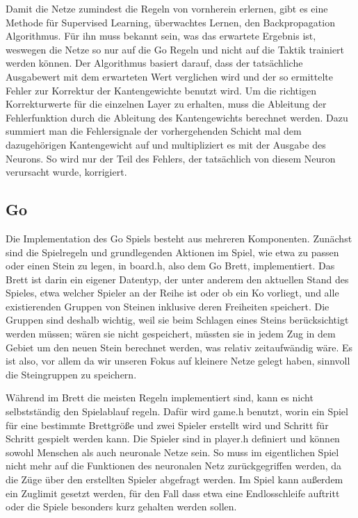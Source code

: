 Damit die Netze zumindest die Regeln von vornherein erlernen, gibt es eine
Methode für Supervised Learning, überwachtes Lernen, den Backpropagation
Algorithmus. Für ihn muss bekannt sein, was das erwartete Ergebnis ist, weswegen
die Netze so nur auf die Go Regeln und nicht auf die Taktik trainiert werden
können. Der Algorithmus basiert darauf, dass der tatsächliche Ausgabewert mit
dem erwarteten Wert verglichen wird und der so ermittelte Fehler zur Korrektur
der Kantengewichte benutzt wird. Um die richtigen Korrekturwerte für die
einzelnen Layer zu erhalten, muss die Ableitung der Fehlerfunktion durch die
Ableitung des Kantengewichts berechnet werden. Dazu summiert man die
Fehlersignale der vorhergehenden Schicht mal dem dazugehörigen Kantengewicht auf
und multipliziert es mit der Ausgabe des Neurons. So wird nur der Teil des
Fehlers, der tatsächlich von diesem Neuron verursacht wurde, korrigiert. 

\subsection{Go}

Die Implementation des Go Spiels besteht aus mehreren Komponenten. Zunächst sind
die Spielregeln und grundlegenden Aktionen im Spiel, wie etwa zu passen oder
einen Stein zu legen, in board.h, also dem Go Brett, implementiert. Das Brett
ist darin ein eigener Datentyp, der unter anderem den aktuellen Stand des
Spieles, etwa welcher Spieler an der Reihe ist oder ob ein Ko vorliegt, und alle
existierenden Gruppen von Steinen inklusive deren Freiheiten speichert. Die
Gruppen sind deshalb wichtig, weil sie beim Schlagen eines Steins berücksichtigt
werden müssen; wären sie nicht gespeichert, müssten sie in jedem Zug in dem
Gebiet um den neuen Stein berechnet werden, was relativ zeitaufwändig wäre. Es
ist also, vor allem da wir unseren Fokus auf kleinere Netze gelegt haben,
sinnvoll die Steingruppen zu speichern. 

Während im Brett die meisten Regeln implementiert sind, kann es nicht
selbstständig den Spielablauf regeln. Dafür wird game.h benutzt, worin ein Spiel
für eine bestimmte Brettgröße und zwei Spieler erstellt wird und Schritt für
Schritt gespielt werden kann. Die Spieler sind in player.h definiert und können
sowohl Menschen als auch neuronale Netze sein. So muss im eigentlichen Spiel
nicht mehr auf die Funktionen des neuronalen Netz zurückgegriffen werden, da die
Züge über den erstellten Spieler abgefragt werden. Im Spiel kann außerdem ein
Zuglimit gesetzt werden, für den Fall dass etwa eine Endlosschleife auftritt
oder die Spiele besonders kurz gehalten werden sollen. 

